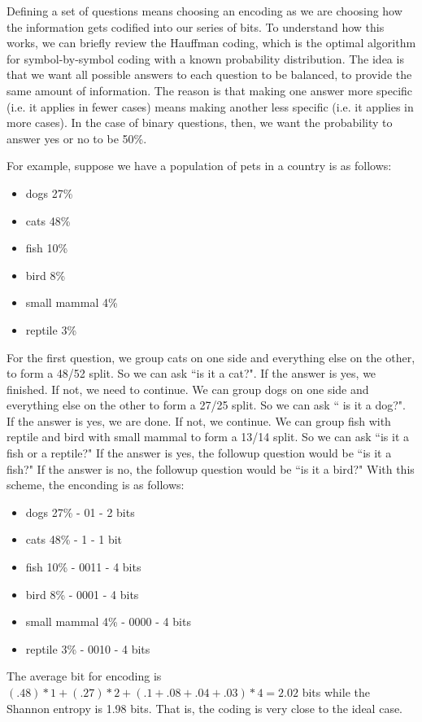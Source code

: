 \documentclass{article}
\begin{document}
Defining a set of questions means choosing an encoding as we are choosing how the information gets codified into our series of bits. To understand how this works, we can briefly review the Hauffman coding, which is the optimal algorithm for symbol-by-symbol coding with a known probability distribution. The idea is that we want all possible answers to each question to be balanced, to provide the same amount of information. The reason is that making one answer more specific (i.e. it applies in fewer cases) means making another less specific (i.e. it applies in more cases). In the case of binary questions, then, we want the probability to answer yes or no to be 50\%.

For example, suppose we have a population of pets in a country is as follows:
\begin{itemize}
\item dogs 27\%
\item cats 48\%
\item fish 10\%
\item bird 8\%
\item small mammal 4\%
\item reptile 3\%
\end{itemize}
For the first question, we group cats on one side and everything else on the other, to form a 48/52 split. So we can ask ``is it a cat?". If the answer is yes, we finished. If not, we need to continue. We can group dogs on one side and everything else on the other to form a 27/25 split. So we can ask `` is it a dog?". If the answer is yes, we are done. If not, we continue. We can group fish with reptile and bird with small mammal to form a 13/14 split. So we can ask ``is it a fish or a reptile?" If the answer is yes, the followup question would be ``is it a fish?" If the answer is no, the followup question would be ``is it a bird?" With this scheme, the enconding is as follows:
\begin{itemize}
\item dogs 27\% - 01 - 2 bits
\item cats 48\% - 1 - 1 bit
\item fish 10\% - 0011 - 4 bits
\item bird 8\% - 0001 - 4 bits
\item small mammal 4\% - 0000 - 4 bits
\item reptile 3\% - 0010 - 4 bits
\end{itemize}
The average bit for encoding is $(.48) * 1 + (.27) * 2 + (.1 + .08 + .04 + .03) * 4 = 2.02$ bits while the Shannon entropy is 1.98 bits. That is, the coding is very close to the ideal case.
\end{document}
